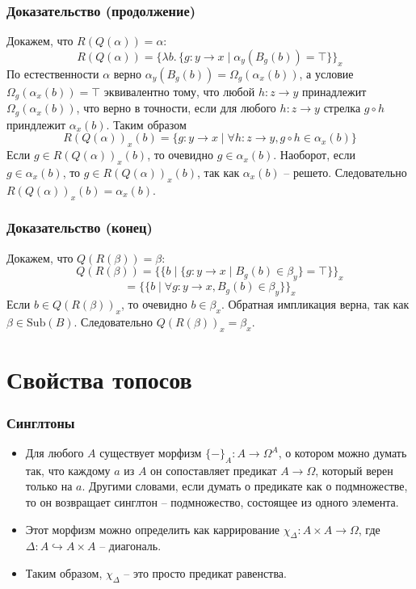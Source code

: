 \documentclass{beamer}
\theoremstyle{definition}
\newcommand{\fs}[1]{\mathrm{#1}}
\newcommand{\Sub}{\fs{Sub}}
\begin{document}
\begin{frame}
\frametitle{Доказательство (продолжение)}
Докажем, что $R(Q(\alpha)) = \alpha$:
\[ R(Q(\alpha)) = \{ \lambda b.\,\{ g : y \to x \mid \alpha_y(B_g(b)) = \top \} \}_x \]
По естественности $\alpha$ верно $\alpha_y(B_g(b)) = \Omega_g(\alpha_x(b))$, а условие $\Omega_g(\alpha_x(b)) = \top$ эквивалентно тому, что любой $h : z \to y$ принадлежит $\Omega_g(\alpha_x(b))$, что верно в точности, если для любого $h : z \to y$ стрелка $g \circ h$ приндлежит $\alpha_x(b)$.
Таким образом
\[ R(Q(\alpha))_x(b) = \{ g : y \to x \mid \forall h : z \to y, g \circ h \in \alpha_x(b) \} \]
Если $g \in R(Q(\alpha))_x(b)$, то очевидно $g \in \alpha_x(b)$.
Наоборот, если $g \in \alpha_x(b)$, то $g \in R(Q(\alpha))_x(b)$, так как $\alpha_x(b)$ -- решето.
Следовательно $R(Q(\alpha))_x(b) = \alpha_x(b)$.
\end{frame}

\begin{frame}
\frametitle{Доказательство (конец)}
Докажем, что $Q(R(\beta)) = \beta$:
\[ Q(R(\beta)) = \{ \{ b \mid \{ g : y \to x \mid B_g(b) \in \beta_y \} = \top \} \}_x \]
\[ = \{ \{ b \mid \forall g : y \to x, B_g(b) \in \beta_y \} \}_x \]
Если $b \in Q(R(\beta))_x$, то очевидно $b \in \beta_x$.
Обратная импликация верна, так как $\beta \in \Sub(B)$.
Следовательно $Q(R(\beta))_x = \beta_x$.
\end{frame}

\section{Свойства топосов}

\begin{frame}
\frametitle{Синглтоны}
\begin{itemize}
\item Для любого $A$ существует морфизм $\{-\}_A : A \to \Omega^A$, о котором можно думать так, что каждому $a$ из $A$ он сопоставляет предикат $A \to \Omega$, который верен только на $a$.
Другими словами, если думать о предикате как о подмножестве, то он возвращает синглтон -- подмножество, состоящее из одного элемента.
\item Этот морфизм можно определить как каррирование $\chi_\Delta : A \times A \to \Omega$, где $\Delta : A \hookrightarrow A \times A$ -- диагональ.
\item Таким образом, $\chi_\Delta$ -- это просто предикат равенства.
\end{itemize}
\end{frame}
\end{document}

